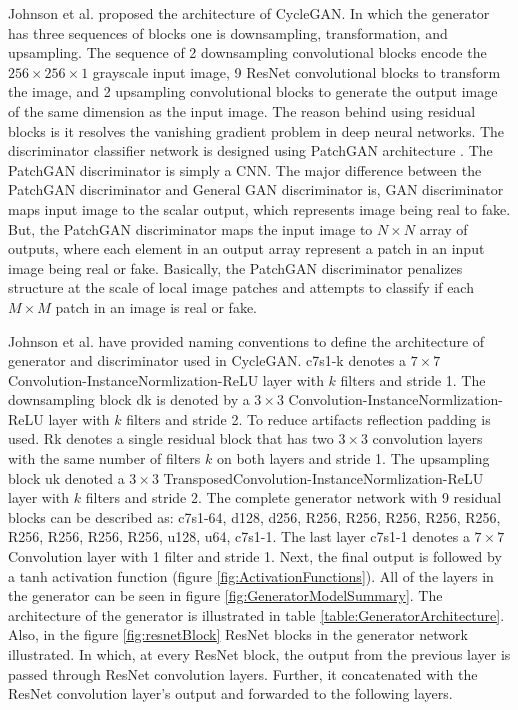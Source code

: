 Johnson et al.\cite{johnson2016perceptual} proposed the architecture of \ac{CycleGAN}. In which the generator has three sequences of blocks one is downsampling, transformation, and upsampling. The sequence of 2 downsampling convolutional blocks encode the $256 \times 256 \times 1$ grayscale input image, 9 \ac{ResNet} convolutional blocks to transform the image, and 2 upsampling convolutional blocks to generate the output image of the same dimension as the input image. The reason behind using residual blocks is it resolves the vanishing gradient problem in deep neural networks. The discriminator classifier network is designed using PatchGAN architecture \cite{isola2018imagetoimage} \cite{li2016precomputed}. The PatchGAN discriminator is simply a \ac{CNN}. The major difference between the PatchGAN discriminator and General \ac{GAN} discriminator is, \ac{GAN} discriminator maps input image to the scalar output, which represents image being real to fake. But, the PatchGAN discriminator maps the input image to $N \times N$ array of outputs, where each element in an output array represent a patch in an input image being real or fake. Basically, the PatchGAN discriminator penalizes structure at the scale of local image patches and attempts to classify if each $M \times M$ patch in an image is real or fake.

Johnson et al. \cite{johnson2016perceptual} have provided naming conventions to define the architecture of generator and discriminator used in \ac{CycleGAN}. {\selectfont c7s1-k} denotes a $7 \times 7$ Convolution-InstanceNormlization-ReLU layer with $k$ filters and stride 1. The downsampling block {\selectfont dk} is denoted by a $3 \times 3$ Convolution-InstanceNormlization-ReLU layer with $k$ filters and stride 2. To reduce artifacts reflection padding is used. {\selectfont Rk} denotes a single residual block that has two $3 \times 3$ convolution layers with the same number of filters $k$ on both layers and stride 1. The upsampling block {\selectfont uk} denoted a $3 \times 3$ TransposedConvolution-InstanceNormlization-ReLU layer with $k$ filters and stride 2. The complete generator network with 9 residual blocks can be described as: {\selectfont c7s1-64, d128, d256, R256, R256, R256, R256, R256, R256, R256, R256, R256, u128, u64, c7s1-1}. The last layer {\selectfont c7s1-1} denotes a $7 \times 7$ Convolution layer with 1 filter and stride 1. Next, the final output is followed by a tanh activation function (figure \ref{fig:ActivationFunctions}). All of the layers in the generator can be seen in figure \ref{fig:GeneratorModelSummary}. The architecture of the generator is illustrated in table \ref{table:GeneratorArchitecture}. Also, in the figure \ref{fig:resnetBlock} \ac{ResNet} blocks in the generator network illustrated. In which, at every \ac{ResNet} block, the output from the previous layer is passed through \ac{ResNet} convolution layers. Further, it concatenated with the \ac{ResNet} convolution layer's output and forwarded to the following layers.

